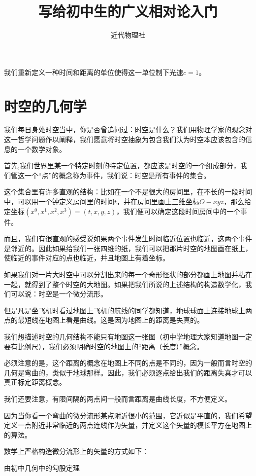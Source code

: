 \documentclass{article}
\begin{document}
\title{写给初中生的广义相对论入门}
\author{近代物理社}
\maketitle
我们重新定义一种时间和距离的单位使得这一单位制下光速$c=1$。
\section{时空的几何学}
我们每日身处时空当中，你是否曾追问过：时空是什么？我们用物理学家的观念对这一哲学问题作以阐释，我们愿意将时空抽象为包含我们认为时空本应该包含的信息的一个数学对象。

首先,我们世界里某一个特定时刻的特定位置，都应该是时空的一个组成部分，我们管这一个“点”的概念称为事件，我们说：时空是所有事件的集合。

这个集合里有许多直观的结构：比如在一个不是很大的房间里，在不长的一段时间中，可以用一个钟定义房间里的时间$t$，并在房间里画上三维坐标$O-xyz$，那么给定坐标$(x^0,x^1,x^2,x^3)=(t,x,y,z)$，我们便可以确定这段时间房间中的一个事件。

而且，我们有很直观的感受说如果两个事件发生时间临近位置也临近，这两个事件是邻近的。因此如果给我们一张四维的纸，我们可以把那片时空的地图画在纸上，使临近的事件对应的点也临近，并且地图上有着坐标。

如果我们对一片大时空中可以分割出来的每一个奇形怪状的部分都画上地图并粘在一起，就得到了整个时空的大地图。如果把我们所说的上述结构的构造数学化，我们可以说：时空是一个微分流形。

但是凡是坐飞机时看过地图上飞机的航线的同学都知道，地球球面上连接地球上两点的最短线在地图上看是曲线。这是因为地图上的距离是失真的。

我们想描述时空的几何结构不能只有地图这一张图（初中学地理大家知道地图一定要有比例尺），我们必须明确时空的地图上的“距离（长度）”概念。

必须注意的是，这个距离的概念在地图上不同的点是不同的，因为一般而言时空的几何是弯曲的，类似于地球那样。因此，我们必须逐点给出我们的距离失真才可以真正标定距离概念。

我们还要注意，有限间隔的两点间一般而言距离是曲线长度，不方便定义。

因为当你看一个弯曲的微分流形某点附近很小的范围，它近似是平直的，我们希望定义一点附近非常临近的两点连线作为矢量，并定义这个矢量的模长平方在地图上的算法。

数学上严格构造微分流形上的矢量的方式如下：

由初中几何中的勾股定理
\end{document}
